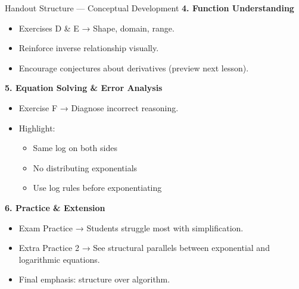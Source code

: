 \documentclass{beamer}
\begin{document}
\begin{frame}{Handout Structure — Conceptual Development}
\textbf{4. Function Understanding}
\begin{itemize}
    \item Exercises D \& E → Shape, domain, range.
    \item Reinforce inverse relationship visually.
    \item Encourage conjectures about derivatives (preview next lesson).
\end{itemize}

\bigskip

\textbf{5. Equation Solving \& Error Analysis}
\begin{itemize}
    \item Exercise F → Diagnose incorrect reasoning.
    \item Highlight:
    \begin{itemize}
        \item Same log on both sides
        \item No distributing exponentials
        \item Use log rules before exponentiating
    \end{itemize}
\end{itemize}

\bigskip

\textbf{6. Practice \& Extension}
\begin{itemize}
    \item Exam Practice → Students struggle most with simplification.
    \item Extra Practice 2 → See structural parallels between exponential and logarithmic equations.
    \item Final emphasis: structure over algorithm.
\end{itemize}
\end{frame}
\end{document}
